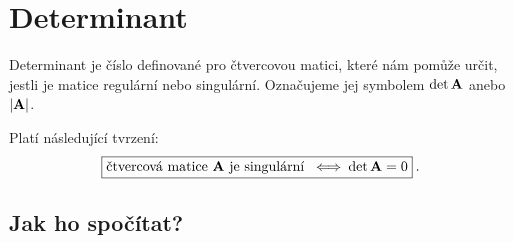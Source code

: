 \section*{Determinant}

Determinant je číslo definované pro čtvercovou matici, které nám pomůže určit, jestli je matice regulární nebo singulární. Označujeme jej symbolem $\det \mathbf{A}$ anebo $|\mathbf{A}|$.

Platí následující tvrzení:
\begin{align}
    \boxed{ \text{čtvercová matice } \mathbf{A} \text{ je singulární } \: \Longleftrightarrow \: \det \mathbf{A} = 0 } \:.
\end{align}

\subsection*{Jak ho spočítat?}

